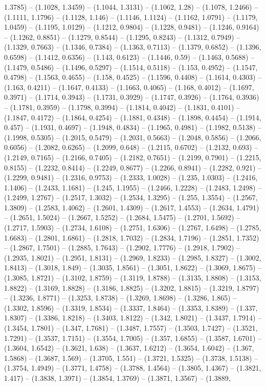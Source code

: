 1.3785) -- (1.1028, 1.3459) -- (1.1044, 1.3131) -- (1.1062, 1.28) -- (1.1078, 1.2466) -- (1.1111, 1.1796) -- (1.1128, 1.146) -- (1.1146, 1.1124) -- (1.1162, 1.0791) -- (1.1179, 1.0459) -- (1.1195, 1.0129) -- (1.1212, 0.9804) -- (1.1228, 0.9481) -- (1.1246, 0.9164) -- (1.1262, 0.8851) -- (1.1279, 0.8544) -- (1.1295, 0.8243) -- (1.1312, 0.7949) -- (1.1329, 0.7663) -- (1.1346, 0.7384) -- (1.1363, 0.7113) -- (1.1379, 0.6852) -- (1.1396, 0.6598) -- (1.1412, 0.6356) -- (1.143, 0.6123) -- (1.1446, 0.59) -- (1.1463, 0.5688) -- (1.1479, 0.5486) -- (1.1496, 0.5297) -- (1.1514, 0.5118) -- (1.153, 0.4952) -- (1.1547, 0.4798) -- (1.1563, 0.4655) -- (1.158, 0.4525) -- (1.1596, 0.4408) -- (1.1614, 0.4303) -- (1.163, 0.4211) -- (1.1647, 0.4133) -- (1.1663, 0.4065) -- (1.168, 0.4012) -- (1.1697, 0.3971) -- (1.1714, 0.3943) -- (1.1731, 0.3929) -- (1.1747, 0.3926) -- (1.1764, 0.3936) -- (1.1781, 0.3959) -- (1.1798, 0.3994) -- (1.1814, 0.4042) -- (1.1831, 0.4101) -- (1.1847, 0.4172) -- (1.1864, 0.4254) -- (1.1881, 0.4348) -- (1.1898, 0.4454) -- (1.1914, 0.457) -- (1.1931, 0.4697) -- (1.1948, 0.4834) -- (1.1965, 0.4981) -- (1.1982, 0.5138) -- (1.1998, 0.5305) -- (1.2015, 0.5479) -- (1.2031, 0.5663) -- (1.2048, 0.5856) -- (1.2066, 0.6056) -- (1.2082, 0.6265) -- (1.2099, 0.648) -- (1.2115, 0.6702) -- (1.2132, 0.693) -- (1.2149, 0.7165) -- (1.2166, 0.7405) -- (1.2182, 0.7651) -- (1.2199, 0.7901) -- (1.2215, 0.8155) -- (1.2232, 0.8414) -- (1.2249, 0.8677) -- (1.2266, 0.8941) -- (1.2282, 0.921) -- (1.2299, 0.9481) -- (1.2316, 0.9753) -- (1.2333, 1.0028) -- (1.235, 1.0303) -- (1.2416, 1.1406) -- (1.2433, 1.1681) -- (1.245, 1.1955) -- (1.2466, 1.2228) -- (1.2483, 1.2498) -- (1.2499, 1.2767) -- (1.2517, 1.3032) -- (1.2534, 1.3295) -- (1.255, 1.3554) -- (1.2567, 1.3809) -- (1.2583, 1.4062) -- (1.2601, 1.4309) -- (1.2617, 1.4553) -- (1.2634, 1.4791) -- (1.2651, 1.5024) -- (1.2667, 1.5252) -- (1.2684, 1.5475) -- (1.2701, 1.5692) -- (1.2717, 1.5903) -- (1.2734, 1.6108) -- (1.2751, 1.6306) -- (1.2767, 1.6498) -- (1.2785, 1.6683) -- (1.2801, 1.6861) -- (1.2818, 1.7032) -- (1.2834, 1.7196) -- (1.2851, 1.7352) -- (1.2867, 1.7501) -- (1.2885, 1.7643) -- (1.2902, 1.7776) -- (1.2918, 1.7902) -- (1.2935, 1.8021) -- (1.2951, 1.8131) -- (1.2969, 1.8233) -- (1.2985, 1.8327) -- (1.3002, 1.8413) -- (1.3018, 1.849) -- (1.3035, 1.8561) -- (1.3051, 1.8622) -- (1.3069, 1.8675) -- (1.3085, 1.8721) -- (1.3102, 1.8759) -- (1.3119, 1.8788) -- (1.3135, 1.8808) -- (1.3153, 1.8822) -- (1.3169, 1.8828) -- (1.3186, 1.8825) -- (1.3202, 1.8815) -- (1.3219, 1.8797) -- (1.3236, 1.8771) -- (1.3253, 1.8738) -- (1.3269, 1.8698) -- (1.3286, 1.865) -- (1.3302, 1.8596) -- (1.3319, 1.8534) -- (1.3337, 1.8464) -- (1.3353, 1.8389) -- (1.337, 1.8307) -- (1.3386, 1.8218) -- (1.3403, 1.8122) -- (1.342, 1.8021) -- (1.3437, 1.7914) -- (1.3454, 1.7801) -- (1.347, 1.7681) -- (1.3487, 1.7557) -- (1.3503, 1.7427) -- (1.3521, 1.7291) -- (1.3537, 1.7151) -- (1.3554, 1.7005) -- (1.357, 1.6855) -- (1.3587, 1.6701) -- (1.3604, 1.6542) -- (1.3621, 1.638) -- (1.3637, 1.6212) -- (1.3654, 1.6042) -- (1.367, 1.5868) -- (1.3687, 1.569) -- (1.3705, 1.551) -- (1.3721, 1.5325) -- (1.3738, 1.5138) -- (1.3754, 1.4949) -- (1.3771, 1.4758) -- (1.3788, 1.4564) -- (1.3805, 1.4367) -- (1.3821, 1.417) -- (1.3838, 1.3971) -- (1.3854, 1.3769) -- (1.3871, 1.3567) -- (1.3889, 